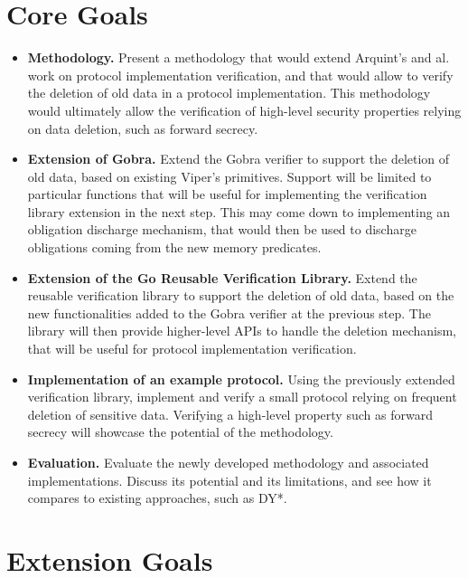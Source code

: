 \documentclass{article}
\begin{document}
\section{Core Goals}

\begin{itemize}
      \item \textbf{Methodology.} Present a methodology that would extend Arquint's and al. work on protocol implementation verification, and that would allow to verify the deletion of old data in a protocol implementation. This methodology would ultimately allow the verification of high-level security properties relying on data deletion, such as forward secrecy.
      \item \textbf{Extension of Gobra.} Extend the Gobra verifier to support the deletion of old data, based on existing Viper's primitives. Support will be limited to particular functions that will be useful for implementing the verification library extension in the next step. This may come down to implementing an obligation discharge mechanism, that would then be used to discharge obligations coming from the new memory predicates.
      \item \textbf{Extension of the Go Reusable Verification Library.} Extend the reusable verification library to support the deletion of old data, based on the new functionalities added to the Gobra verifier at the previous step. The library will then provide higher-level APIs to handle the deletion mechanism, that will be useful for protocol implementation verification.
      \item \textbf{Implementation of an example protocol.} Using the previously extended verification library, implement and verify a small protocol relying on frequent deletion of sensitive data. Verifying a high-level property such as forward secrecy will showcase the potential of the methodology.
      \item \textbf{Evaluation.} Evaluate the newly developed methodology and associated implementations. Discuss its potential and its limitations, and see how it compares to existing approaches, such as DY*.
\end{itemize}

\section{Extension Goals}
\end{document}
